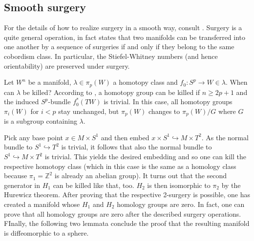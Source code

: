 
\subsection{Smooth surgery}
For the details of how to realize surgery in a smooth way, consult \cite[paragraph 1]{Milnor61}.
Surgery is a quite general operation, in fact \cite[Theorem 1]{Milnor61} states that two manifolds can be transferred 
into one another by a sequence of surgeries if and only if they belong to the same cobordism class.
In particular, the Stiefel-Whitney numbers (and hence orientability) are preserved under surgery.

Let $W^n$ be a manifold, $\lambda \in \pi_p(W)$ a homotopy class and $f_0: S^p \to W \in \lambda$. When can $\lambda$ be killed?
According to \cite[Lemma 3]{Milnor61}, a homotopy group can be killed if $n \geq 2p+1$ and the induced $S^p$-bundle $f_0^*(TW)$ is trivial.
In this case, all homotopy groups $\pi_i(W)$ for $i < p$ stay unchanged, but $\pi_p(W)$ changes to $\pi_p(W)/G$ where $G$ is a subgroup containing $\lambda$.

Pick any base point $x \in M \times S^1$ and then embed $x \times S^1 \hookrightarrow M \times T^2$.
As the normal bundle to $S^1 \hookrightarrow T^2$ is trivial, it follows that also the normal bundle to $S^1 \hookrightarrow M \times T^2$ is trivial.
This yields the desired embedding and so one can kill the respective homotopy class 
(which in this case is the same as a homology class because $\pi_1 = \mathbb Z^2$ is already an abelian group).
It turns out that the second generator in $H_1$ can be killed like that, too.
$H_2$ is then isomorphic to $\pi_2$ by the Hurewicz theorem.
After proving that the respective 2-surgery is possible, one has created a manifold whose $H_1$ and $H_2$ homology groups are zero.
In fact, one can prove that all homology groups are zero after the described surgery operations.
FInally, the following two lemmata conclude the proof that the resulting manifold is diffeomorphic to a sphere.

